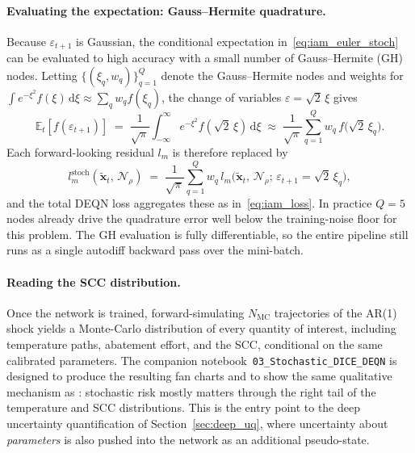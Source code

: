 \documentclass[11pt,a4paper]{report}
\begin{document}
\paragraph{Evaluating the expectation: Gauss--Hermite quadrature.}
Because $\varepsilon_{t+1}$ is Gaussian, the conditional expectation in~\eqref{eq:iam_euler_stoch} can be evaluated to high accuracy with a small number of Gauss--Hermite (GH) nodes.  Letting $\{(\xi_q, w_q)\}_{q=1}^{Q}$ denote the Gauss--Hermite nodes and weights for $\int e^{-\xi^2} f(\xi)\, \mathrm{d}\xi \approx \sum_q w_q f(\xi_q)$, the change of variables $\varepsilon = \sqrt{2}\,\xi$ gives
\begin{equation}
\mathbb{E}_t[f(\varepsilon_{t+1})] \;=\; \frac{1}{\sqrt{\pi}}\int_{-\infty}^\infty e^{-\xi^2} f(\sqrt{2}\,\xi)\,\mathrm{d}\xi \;\approx\; \frac{1}{\sqrt{\pi}}\sum_{q=1}^{Q} w_q\, f\bigl(\sqrt{2}\,\xi_q\bigr).
\label{eq:gh_quadrature}
\end{equation}
Each forward-looking residual $l_m$ is therefore replaced by
\begin{equation}
l_m^{\mathrm{stoch}}(\tilde{\bm{x}}_t,\, \mathcal{N}_\rho) \;=\; \frac{1}{\sqrt{\pi}}\sum_{q=1}^{Q} w_q\, l_m\bigl(\tilde{\bm{x}}_t,\, \mathcal{N}_\rho;\, \varepsilon_{t+1} = \sqrt{2}\,\xi_q\bigr),
\label{eq:loss_gh}
\end{equation}
and the total DEQN loss aggregates these as in~\eqref{eq:iam_loss}.  In practice $Q=5$ nodes already drive the quadrature error well below the training-noise floor for this problem.  The GH evaluation is fully differentiable, so the entire pipeline still runs as a single autodiff backward pass over the mini-batch.

\paragraph{Reading the SCC distribution.}
Once the network is trained, forward-simulating $N_{\mathrm{MC}}$ trajectories of the AR(1) shock yields a Monte-Carlo distribution of every quantity of interest, including temperature paths, abatement effort, and the SCC, conditional on the same calibrated parameters.  The companion notebook~\texttt{03\_Stochastic\_DICE\_DEQN} is designed to produce the resulting fan charts and to show the same qualitative mechanism as \citet{caiSocialCostCarbon2019}: stochastic risk mostly matters through the right tail of the temperature and SCC distributions.  This is the entry point to the deep uncertainty quantification of Section~\ref{sec:deep_uq}, where uncertainty about \emph{parameters} is also pushed into the network as an additional pseudo-state.
\end{document}
